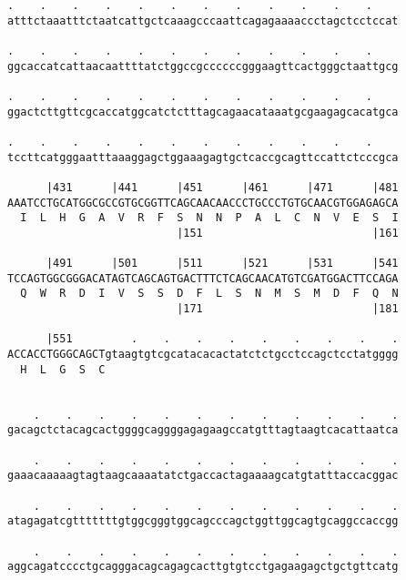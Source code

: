 \documentclass{article}
\begin{document}
\begin{Verbatim}
.    .    .    .    .    .    .    .    .    .    .    .    
atttctaaatttctaatcattgctcaaagcccaattcagagaaaaccctagctcctccat
                                                            
.    .    .    .    .    .    .    .    .    .    .    .    
ggcaccatcattaacaattttatctggccgccccccgggaagttcactgggctaattgcg
                                                            
.    .    .    .    .    .    .    .    .    .    .    .    
ggactcttgttcgcaccatggcatctctttagcagaacataaatgcgaagagcacatgca
                                                            
.    .    .    .    .    .    .    .    .    .    .    .    
tccttcatgggaatttaaaggagctggaaagagtgctcaccgcagttccattctcccgca
                                                            
      |431      |441      |451      |461      |471      |481
AAATCCTGCATGGCGCCGTGCGGTTCAGCAACAACCCTGCCCTGTGCAACGTGGAGAGCA
  I  L  H  G  A  V  R  F  S  N  N  P  A  L  C  N  V  E  S  I
                          |151                          |161
  
      |491      |501      |511      |521      |531      |541
TCCAGTGGCGGGACATAGTCAGCAGTGACTTTCTCAGCAACATGTCGATGGACTTCCAGA
  Q  W  R  D  I  V  S  S  D  F  L  S  N  M  S  M  D  F  Q  N
                          |171                          |181
  
      |551         .    .    .    .    .    .    .    .    .
ACCACCTGGGCAGCTgtaagtgtcgcatacacactatctctgcctccagctcctatgggg
  H  L  G  S  C                                             
                                                            
  
    .    .    .    .    .    .    .    .    .    .    .    .
gacagctctacagcactggggcaggggagagaagccatgtttagtaagtcacattaatca
                                                            
    .    .    .    .    .    .    .    .    .    .    .    .
gaaacaaaaagtagtaagcaaaatatctgaccactagaaaagcatgtatttaccacggac
                                                            
    .    .    .    .    .    .    .    .    .    .    .    .
atagagatcgtttttttgtggcgggtggcagcccagctggttggcagtgcaggccaccgg
                                                            
    .    .    .    .    .    .    .    .    .    .    .    .
aggcagatcccctgcagggacagcagagcacttgtgtcctgagaagagctgctgttcatg
                                                            

\end{Verbatim}
\end{document}
